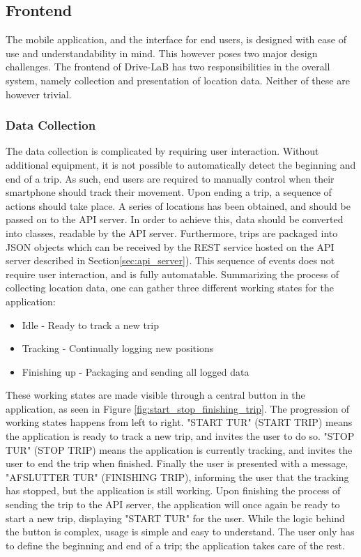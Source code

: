 \subsection{Frontend}\label{subsec:frontend_design}
The mobile application, and the interface for end users, is designed with ease of use and understandability in mind. This however poses two major design challenges. The frontend of Drive-LaB has two responsibilities in the overall system, namely collection and presentation of location data. Neither of these are however trivial.

\subsubsection{Data Collection}\label{subsubsec:design_datacollection}
The data collection is complicated by requiring user interaction. Without additional equipment, it is not possible to automatically detect the beginning and end of a trip. As such, end users are required to manually control when their smartphone should track their movement. Upon ending a trip, a sequence of actions should take place. A series of locations has been obtained, and should be passed on to the API server. In order to achieve this, data should be converted into classes, readable by the API server. Furthermore, trips are packaged into JSON objects which can be received by the REST service hosted on the API server described in Section\ref{sec:api_server}). This sequence of events does not require user interaction, and is fully automatable. Summarizing the process of collecting location data, one can gather three different working states for the application:

\begin{itemize}
\item Idle - Ready to track a new trip
\item Tracking - Continually logging new positions
\item Finishing up - Packaging and sending all logged data
\end{itemize}

These working states are made visible through a central button in the application, as seen in Figure \ref{fig:start_stop_finishing_trip}. The progression of working states happens from left to right. "START TUR" (START TRIP) means the application is ready to track a new trip, and invites the user to do so. "STOP TUR" (STOP TRIP) means the application is currently tracking, and invites the user to end the trip when finished. Finally the user is presented with a message, "AFSLUTTER TUR" (FINISHING TRIP), informing the user that the tracking has stopped, but the application is still working. Upon finishing the process of sending the trip to the API server, the application will once again be ready to start a new trip, displaying "START TUR" for the user.
While the logic behind the button is complex, usage is simple and easy to understand. The user only has to define the beginning and end of a trip; the application takes care of the rest.


